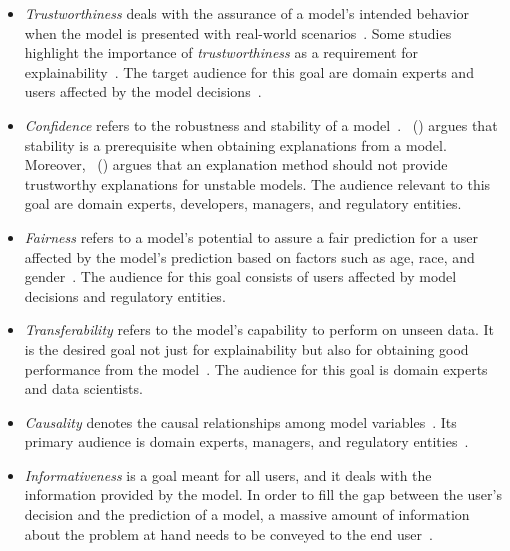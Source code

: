\begin{itemize}
    \item \emph{Trustworthiness} deals with the assurance of a model's intended behavior when the model is presented with real-world scenarios~\parencite{TheMythosOfModelInterpretability_Lipton, StructuringDimensionsForCollaborative_Antunes}. Some studies highlight the importance of \emph{trustworthiness} as a requirement for explainability~\parencite{WhyShouldITrustYou_Riberio, InteractiveBayesianCaseModel_Kim}. The target audience for this goal are domain experts and users affected by the model decisions~\parencite{XAIConceptsTaxonomies_Arrieta}.
    \item \emph{Confidence} refers to the robustness and stability of a model~\parencite{XAIConceptsTaxonomies_Arrieta}.~\citeauthor{Stability_Yu} (\citeyear{Stability_Yu}) argues that stability is a prerequisite when obtaining explanations from a model. Moreover,~\citeauthor{XAIConceptsTaxonomies_Arrieta} (\citeyear{XAIConceptsTaxonomies_Arrieta}) argues that an explanation method should not provide trustworthy explanations for unstable models. The audience relevant to this goal are domain experts, developers, managers, and regulatory entities.
    \item \emph{Fairness} refers to a model's potential to assure a fair prediction for a user affected by the model's prediction based on factors such as age, race, and gender~\parencite{XAIConceptsTaxonomies_Arrieta, FairnessInML_Oneto}. The audience for this goal consists of users affected by model decisions and regulatory entities.
    \item \emph{Transferability} refers to the model's capability to perform on unseen data. It is the desired goal not just for explainability but also for obtaining good performance from the model~\parencite{AppliedPredictiveModeling_Kuhn}. The audience for this goal is domain experts and data scientists.
    \item \emph{Causality} denotes the causal relationships among model variables~\parencite{Causality_Pearl}. Its primary audience is domain experts, managers, and regulatory entities~\parencite{XAIConceptsTaxonomies_Arrieta}.
    \item \emph{Informativeness} is a goal meant for all users, and it deals with the information provided by the model. In order to fill the gap between the user's decision and the prediction of a model, a massive amount of information about the problem at hand needs to be conveyed to the end user~\parencite{XAIConceptsTaxonomies_Arrieta}.

\end{itemize}
